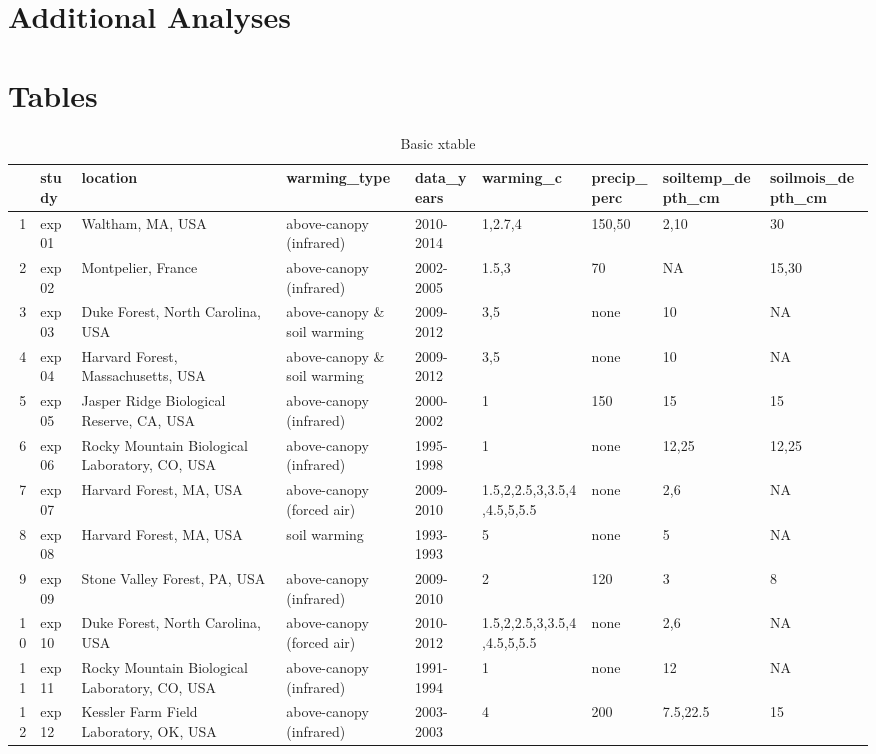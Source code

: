 \documentclass{article}
\begin{document}
\section* {Additional Analyses}



\clearpage
\section* {Tables}

\begin{landscape}

\begin{table}[ht]
\centering
\caption{Basic xtable} 
\label{table:sites}
\begin{tabular}{rllllllll}
  \hline
 & study & location & warming\_type & data\_years & warming\_c & precip\_perc & soiltemp\_depth\_cm & soilmois\_depth\_cm \\ 
  \hline
1 & exp01 & Waltham, MA, USA & above-canopy (infrared) & 2010-2014 & 1,2.7,4 & 150,50 & 2,10 & 30 \\ 
  2 & exp02 & Montpelier, France & above-canopy (infrared) & 2002-2005 & 1.5,3 & 70 & NA & 15,30 \\ 
  3 & exp03 & Duke Forest, North Carolina, USA & above-canopy \& soil warming & 2009-2012 & 3,5 & none & 10 & NA \\ 
  4 & exp04 & Harvard Forest, Massachusetts, USA & above-canopy \& soil warming & 2009-2012 & 3,5 & none & 10 & NA \\ 
  5 & exp05 & Jasper Ridge Biological Reserve, CA, USA & above-canopy (infrared) & 2000-2002 & 1 & 150 & 15 & 15 \\ 
  6 & exp06 & Rocky Mountain Biological Laboratory, CO, USA & above-canopy (infrared) & 1995-1998 & 1 & none & 12,25 & 12,25 \\ 
  7 & exp07 & Harvard Forest, MA, USA & above-canopy (forced air) & 2009-2010 & 1.5,2,2.5,3,3.5,4,4.5,5,5.5 & none & 2,6 & NA \\ 
  8 & exp08 & Harvard Forest, MA, USA & soil warming & 1993-1993 & 5 & none & 5 & NA \\ 
  9 & exp09 & Stone Valley Forest, PA, USA & above-canopy (infrared) & 2009-2010 & 2 & 120 & 3 & 8 \\ 
  10 & exp10 & Duke Forest, North Carolina, USA & above-canopy (forced air) & 2010-2012 & 1.5,2,2.5,3,3.5,4,4.5,5,5.5 & none & 2,6 & NA \\ 
  11 & exp11 & Rocky Mountain Biological Laboratory, CO, USA & above-canopy (infrared) & 1991-1994 & 1 & none & 12 & NA \\ 
  12 & exp12 & Kessler Farm Field Laboratory, OK, USA & above-canopy (infrared) & 2003-2003 & 4 & 200 & 7.5,22.5 & 15 \\ 
   \hline
\end{tabular}
\end{table}
\end{landscape}
\end{document}
